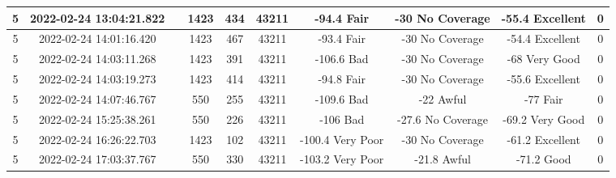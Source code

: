 \begin{longtable*}{|c|c|c|c|c|c|c|c|c|c|}
5&2022-02-24 13:04:21.822&&1423&434&43211& -94.4     Fair        & -30       No Coverage & -55.4     Excellent   & 0\\\hline
{}5&2022-02-24 14:01:16.420&&1423&467&43211& -93.4     Fair        & -30       No Coverage & -54.4     Excellent   & 0\\\hline
{}5&2022-02-24 14:03:11.268&&1423&391&43211& -106.6    Bad         & -30       No Coverage & -68       Very Good   & 0\\\hline
{}5&2022-02-24 14:03:19.273&&1423&414&43211& -94.8     Fair        & -30       No Coverage & -55.6     Excellent   & 0\\\hline
{}5&2022-02-24 14:07:46.767&&550&255&43211& -109.6    Bad         & -22       Awful       & -77       Fair        & 0\\\hline
{}5&2022-02-24 15:25:38.261&&550&226&43211& -106      Bad         & -27.6     No Coverage & -69.2     Very Good   & 0\\\hline
{}5&2022-02-24 16:26:22.703&&1423&102&43211& -100.4    Very Poor   & -30       No Coverage & -61.2     Excellent   & 0\\\hline
{}5&2022-02-24 17:03:37.767&&550&330&43211& -103.2    Very Poor   & -21.8     Awful       & -71.2     Good        & 0\\\hline

\end{longtable*}

